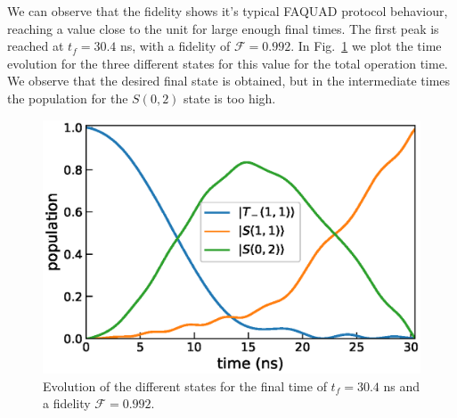 \documentclass[a4paper,11pt]{article}
\begin{document}
We can observe that the fidelity shows it's typical FAQUAD protocol behaviour, reaching a value close to the unit for large enough final times. The first peak is reached at $t_f=30.4$ ns, with a fidelity of $\mathcal{F}=0.992$. In Fig.~\ref{fig:states_evolution} we plot the time evolution for the three different states for this value for the total operation time. We observe that the desired final state is obtained, but in the intermediate times the population for the $S(0,2)$ state is too high.
\begin{figure}[!htbp]
	\centering
	\includegraphics[width=0.7\linewidth]{states_evolution.eps}
	\caption{Evolution of the different states for the final time of $t_f=30.4$ ns and a fidelity $\mathcal{F}=0.992$.}
	\label{fig:states_evolution}
\end{figure}


\appendix
\end{document}
